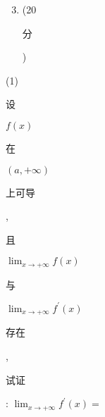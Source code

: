 \documentclass[10pt]{article}
\begin{document}
\begin{enumerate}
  \setcounter{enumi}{2}
  \item (20 \begin{CJK}{UTF8}{mj}分\end{CJK})
\end{enumerate}
(1) \begin{CJK}{UTF8}{mj}设\end{CJK} $f(x)$ \begin{CJK}{UTF8}{mj}在\end{CJK} $(a,+\infty)$ \begin{CJK}{UTF8}{mj}上可导\end{CJK}, \begin{CJK}{UTF8}{mj}且\end{CJK} $\lim _{x \rightarrow+\infty} f(x)$ \begin{CJK}{UTF8}{mj}与\end{CJK} $\lim _{x \rightarrow+\infty} f^{\prime}(x)$ \begin{CJK}{UTF8}{mj}存在\end{CJK}, \begin{CJK}{UTF8}{mj}试证\end{CJK}: $\lim _{x \rightarrow+\infty} f^{\prime}(x)=$
\end{document}
